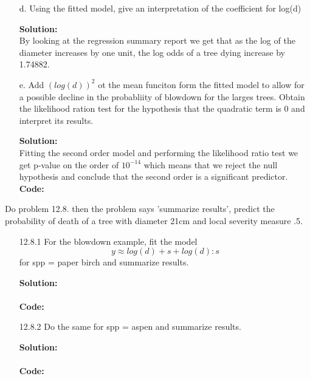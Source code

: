\documentclass[12pt]{article}
\makeatletter
\theoremstyle{homework}
\newenvironment{exercise}[1]
{\def\@currentlabel{#1}\exercisecore}
{\endexercisecore}
\newcommand{\localhead}[1]{\par\smallskip\noindent\textbf{#1}\nobreak\\}%
\newcommand\solution{\localhead{Solution:}}
\makeatother
\begin{document}
\begin{exercise}{1}
\begin{enumerate}
    \item[d.] Using the fitted model, give an interpretation of the coefficient for log(d)\\
    \solution By looking at the regression summary report we get that as the log of the diameter increases by one unit, the 
    log odds of a tree dying increase by 1.74882. 
    \newpage

    \item[e.] Add $(log(d))^2$ ot the mean funciton form the fitted model to allow for a possible decline in the probabliity of blowdown for the larges trees. Obtain 
    the likelihood ration test for the hypothesis that the quadratic term is 0 and interpret its results. \\
    \solution Fitting the second order model and performing the likelihood ratio test we get p-value on the order of $10^{-14}$ which means that we reject the null hypothesis and conclude that the
    second order is a significant predictor. \\
    \textbf{Code:}
    \begin{center}
    
    \end{center} 
    \newpage

  \end{enumerate}
\end{exercise}

\begin{exercise}{2} Do problem 12.8. then the problem says 'summarize results', predict the probability of death of a tree with diameter 21cm and local severity measure .5.\\
  \begin{enumerate}
    \item[12.8.1] For the blowdown example, fit the model 
    \begin{equation*}
      y \approx log(d) + s + log(d):s
    \end{equation*} 
    for spp = paper birch and summarize results.\\
    \solution\\
    \textbf{Code:}
    \begin{center}
    
    \end{center} 
    \newpage


    \item[12.8.2] Do the same for spp = aspen and summarize results.\\
    \solution \\
    \textbf{Code:}
    \begin{center}
    
    \end{center} 
    \newpage

  \end{enumerate}
  
\end{exercise}
\end{document}
